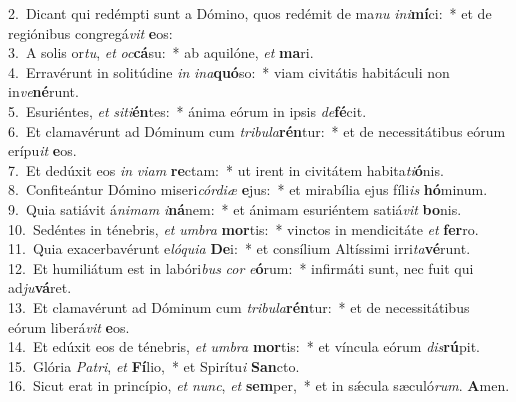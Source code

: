 {2.~}Dicant qui redémpti sunt a Dómino, quos redémit de ma\textit{nu} \textit{i}\textit{ni}\textbf{mí}ci:~* et de regiónibus congregá\textit{vit} \textbf{e}os:\\
{3.~}A solis or\textit{tu}, \textit{et} \textit{oc}\textbf{cá}su:~* ab aquilóne, \textit{et} \textbf{ma}ri.\\
{4.~}Erravérunt in solitúdine \textit{in} \textit{i}\textit{na}\textbf{quó}so:~* viam civitátis habitáculi non in\textit{ve}\textbf{né}runt.\\
{5.~}Esuriéntes, \textit{et} \textit{si}\textit{ti}\textbf{én}tes:~* ánima eórum in ipsis \textit{de}\textbf{fé}cit.\\
{6.~}Et clamavérunt ad Dóminum cum \textit{tri}\textit{bu}\textit{la}\textbf{rén}tur:~* et de necessitátibus eórum erípu\textit{it} \textbf{e}os.\\
{7.~}Et dedúxit eos \textit{in} \textit{vi}\textit{am} \textbf{re}ctam:~* ut irent in civitátem habita\textit{ti}\textbf{ó}nis.\\
{8.~}Confiteántur Dómino miseri\textit{cór}\textit{di}\textit{æ} \textbf{e}jus:~* et mirabília ejus fíli\textit{is} \textbf{hó}minum.\\
{9.~}Quia satiávit á\textit{ni}\textit{mam} \textit{i}\textbf{ná}nem:~* et ánimam esuriéntem satiá\textit{vit} \textbf{bo}nis.\\
{10.~}Sedéntes in ténebris, \textit{et} \textit{um}\textit{bra} \textbf{mor}tis:~* vinctos in mendicitáte \textit{et} \textbf{fer}ro.\\
{11.~}Quia exacerbavérunt e\textit{ló}\textit{qui}\textit{a} \textbf{De}i:~* et consílium Altíssimi irri\textit{ta}\textbf{vé}runt.\\
{12.~}Et humiliátum est in labóri\textit{bus} \textit{cor} \textit{e}\textbf{ó}rum:~* infirmáti sunt, nec fuit qui ad\textit{ju}\textbf{vá}ret.\\
{13.~}Et clamavérunt ad Dóminum cum \textit{tri}\textit{bu}\textit{la}\textbf{rén}tur:~* et de necessitátibus eórum liberá\textit{vit} \textbf{e}os.\\
{14.~}Et edúxit eos de ténebris, \textit{et} \textit{um}\textit{bra} \textbf{mor}tis:~* et víncula eórum \textit{dis}\textbf{rú}pit.\\
{15.~}Glória \textit{Pa}\textit{tri}, \textit{et} \textbf{Fí}lio,~* et Spirítu\textit{i} \textbf{San}cto.\\
{16.~}Sicut erat in princípio, \textit{et} \textit{nunc}, \textit{et} \textbf{sem}per,~* et in sǽcula sæculó\textit{rum}. \textbf{A}men.\\
